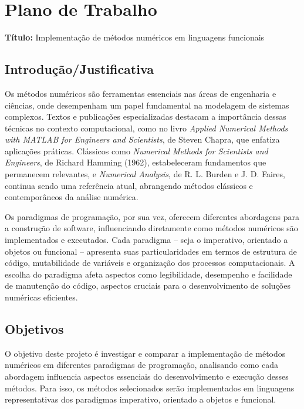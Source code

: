\section{Plano de Trabalho}

\noindent
\textbf{Título:} Implementação de métodos numéricos em linguagens funcionais

\subsection{Introdução/Justificativa}

Os métodos numéricos são ferramentas essenciais nas áreas de engenharia e
ciências, onde desempenham um papel fundamental na modelagem de sistemas
complexos. Textos e publicações especializadas destacam a importância dessas
técnicas no contexto computacional, como no livro
\textit{Applied Numerical Methods with MATLAB for Engineers and Scientists},
de Steven Chapra, que enfatiza aplicações práticas. Clássicos como
\textit{Numerical Methods for Scientists and Engineers}, de Richard Hamming
(1962), estabeleceram fundamentos que permanecem relevantes, e
\textit{Numerical Analysis}, de R. L. Burden e J. D. Faires, continua sendo
uma referência atual, abrangendo métodos clássicos e contemporâneos da análise
numérica.

Os paradigmas de programação, por sua vez, oferecem diferentes abordagens para
a construção de software, influenciando diretamente como métodos numéricos são
implementados e executados. Cada paradigma -- seja o imperativo, orientado a
objetos ou funcional -- apresenta suas particularidades em termos de estrutura
de código, mutabilidade de variáveis e organização dos processos
computacionais. A escolha do paradigma afeta aspectos como legibilidade,
desempenho e facilidade de manutenção do código, aspectos cruciais para o
desenvolvimento de soluções numéricas eficientes.

\subsection{Objetivos}

O objetivo deste projeto é investigar e comparar a implementação de métodos
numéricos em diferentes paradigmas de programação, analisando como cada
abordagem influencia aspectos essenciais do desenvolvimento e execução desses
métodos. Para isso, os métodos selecionados serão implementados em linguagens
representativas dos paradigmas imperativo, orientado a objetos e funcional.

